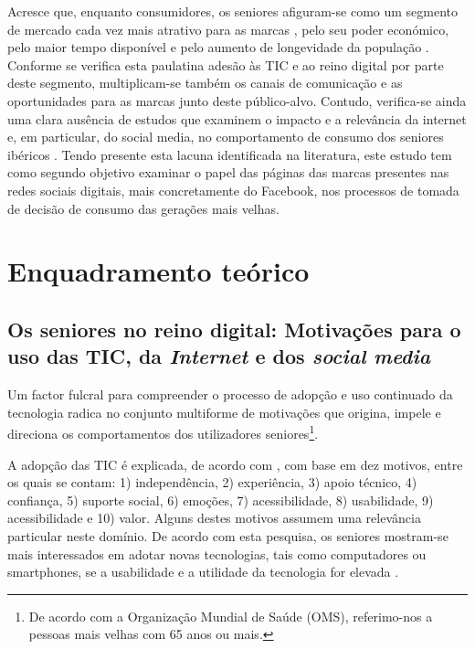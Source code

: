 \documentclass[portuguese]{textolivre}
\begin{document}
Acresce que, enquanto consumidores, os seniores afiguram-se como um segmento de mercado cada vez mais atrativo para as marcas \cite{kantar2018}, pelo seu poder económico, pelo maior tempo disponível e pelo aumento de longevidade da população \cite{friemel2016}. Conforme se verifica esta paulatina adesão às TIC e ao reino digital por parte deste segmento, multiplicam-se também os canais de comunicação e as oportunidades para as marcas junto deste público-alvo. Contudo, verifica-se ainda uma clara ausência de estudos que examinem o impacto e a relevância da internet e, em particular, do social media, no comportamento de consumo dos seniores ibéricos \cite{gama2020, miranda2020}. Tendo presente esta lacuna identificada na literatura, este estudo tem como segundo objetivo examinar o papel das páginas das marcas presentes nas redes sociais digitais, mais concretamente do Facebook, nos processos de tomada de decisão de consumo das gerações mais velhas.

\section{Enquadramento teórico}
\subsection{Os seniores no reino digital: Motivações para o uso das TIC, da \emph{Internet} e dos \emph{social media}}
Um factor fulcral para compreender o processo de adopção e uso continuado da tecnologia radica no conjunto multiforme de motivações que origina, impele e direciona os comportamentos dos utilizadores seniores\footnote{De acordo com a Organização Mundial de Saúde (OMS), referimo-nos a pessoas mais velhas com 65 anos ou mais.}.

A adopção das TIC é explicada, de acordo com \textcite{lee2015}, com base em dez motivos, entre os quais se contam: 1) independência, 2) experiência, 3) apoio técnico, 4) confiança, 5) suporte social, 6) emoções, 7) acessibilidade, 8) usabilidade, 9) acessibilidade e 10) valor. Alguns destes motivos assumem uma relevância particular neste domínio. De acordo com esta pesquisa, os seniores mostram-se mais interessados em adotar novas tecnologias, tais como computadores ou smartphones, se a usabilidade e a utilidade da tecnologia for elevada \cite{lee2015}.
\end{document}
